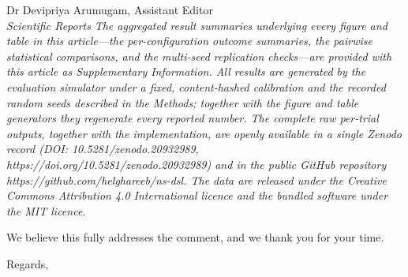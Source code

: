 \documentclass[11pt]{letter}
\begin{document}
\begin{letter}{Dr Devipriya Arumugam, Assistant Editor\\\textit{Scientific Reports}}
\begingroup\small\itshape
The aggregated result summaries underlying every figure and table in this article---the
per-configuration outcome summaries, the pairwise statistical comparisons, and the multi-seed
replication checks---are provided with this article as Supplementary Information. All results are
generated by the evaluation simulator under a fixed, content-hashed calibration and the recorded
random seeds described in the Methods; together with the figure and table generators they regenerate
every reported number. The complete raw per-trial outputs, together with the implementation, are
openly available in a single Zenodo record (DOI: 10.5281/zenodo.20932989,
https://doi.org/10.5281/zenodo.20932989) and in the public GitHub repository
https://github.com/helghareeb/ns-dsl. The data are released under the Creative Commons Attribution
4.0 International licence and the bundled software under the MIT licence.
\endgroup

\medskip
We believe this fully addresses the comment, and we thank you for your time.

\closing{Regards,}
\end{letter}
\end{document}
